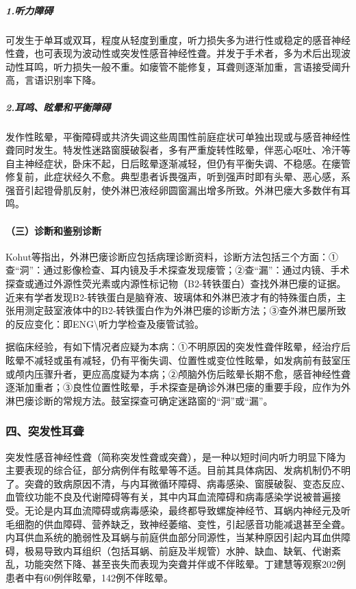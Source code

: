 \subparagraph{1.听力障碍}

可发生于单耳或双耳，程度从轻度到重度，听力损失多为进行性或稳定的感音神经性聋，也可表现为波动性或突发性感音神经性聋。并发于手术者，多为术后出现波动性耳鸣，听力损失一般不重。如瘘管不能修复，耳聋则逐渐加重，言语接受阈升高，言语识别率下降。

\subparagraph{2.耳鸣、眩晕和平衡障碍}

发作性眩晕，平衡障碍或共济失调这些周围性前庭症状可单独出现或与感音神经性聋同时发生。特发性迷路窗膜破裂者，多有严重旋转性眩晕，伴恶心呕吐、冷汗等自主神经症状，卧床不起，日后眩晕逐渐减轻，但仍有平衡失调、不稳感。在瘘管修复前，此症状经久不愈。典型患者诉畏强声，听到强声时即有头晕、恶心感，系强音引起镫骨肌反射，使外淋巴液经卵圆窗漏出增多所致。外淋巴瘘大多数伴有耳鸣。

\paragraph{（三）诊断和鉴别诊断}

Kohut等指出，外淋巴瘘诊断应包括病理诊断资料，诊断方法包括三个方面：①查“洞”：通过影像检查、耳内镜及手术探查发现瘘管；②查“漏”：通过内镜、手术探查或通过外源性荧光素或内源性标记物（B2-转铁蛋白）查找外淋巴瘘的证据。近来有学者发现B2-转铁蛋白是脑脊液、玻璃体和外淋巴液才有的特殊蛋白质，主张用测定鼓室液体中的B2-转铁蛋白作为外淋巴瘘的诊断方法；③查外淋巴屡所致的反应变化：即ENG\textbackslash{}听力学检查及瘘管试验。

据临床经验，有如下情况者应疑为本病：①不明原因的突发性聋伴眩晕，经治疗后眩晕不减轻或虽有减轻，仍有平衡失调、位置性或变位性眩晕，如发病前有鼓室压或颅内压骤升者，更应高度疑为本病；②颅脑外伤后眩晕长期不愈，感音神经性聋逐渐加重者；③良性位置性眩晕，手术探查是确诊外淋巴瘘的重要手段，应作为外淋巴瘘诊断的常规方法。鼓室探查可确定迷路窗的“洞”或“漏”。

\subsubsection{四、突发性耳聋}

突发性感音神经性聋（简称突发性聋或突聋），是一种以短时间内听力明显下降为主要表现的综合征，部分病例伴有眩晕等不适。目前其具体病因、发病机制仍不明了。突聋的致病原因不清，与内耳微循环障碍、病毒感染、窗膜破裂、变态反应、血管纹功能不良及代谢障碍等有关，其中内耳血流障碍和病毒感染学说被普遍接受。无论是内耳血流障碍或病毒感染，最终都导致螺旋神经节、耳蜗内神经元及听毛细胞的供血障碍、营养缺乏，致神经萎缩、变性，引起感音功能减退甚至全聋。内耳供血系统的脆弱性及耳蜗与前庭供血部分同源性，当某种原因引起内耳血供障碍，极易导致内耳组织（包括耳蜗、前庭及半规管）水肿、缺血、缺氧、代谢紊乱，功能突然下降、甚至丧失而表现为突聋并伴或不伴眩晕。丁建慧等观察202例患者中有60例伴眩晕，142例不伴眩晕。

